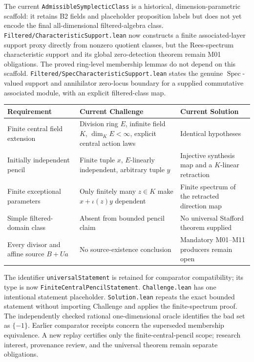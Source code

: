 \documentclass[10pt,a4paper]{article}
\newcommand{\lean}[1]{\nolinkurl{#1}}
\begin{document}
The current \lean{AdmissibleSymplecticClass} is a historical,
dimension-parametric scaffold: it retains B2 fields and placeholder
proposition labels but does not yet encode the final all-dimensional
filtered-algebra class. \lean{Filtered/CharacteristicSupport.lean} now
constructs a finite associated-layer support proxy directly from nonzero
quotient classes, but the Rees-spectrum characteristic support and its global
zero-detection theorem remain M01 obligations. The proved ring-level
membership lemmas do not depend on this scaffold.
\lean{Filtered/SpecCharacteristicSupport.lean} states the genuine
\(\operatorname{Spec}\)-valued support and annihilator zero-locus boundary for
a supplied commutative associated module, with an explicit filtered-class map.

\begin{center}
\begin{tabularx}{\textwidth}{@{}Y Y Y@{}}
\toprule
Requirement & Current Challenge & Current Solution\\
\midrule
Finite central field extension & Division ring \(E\), infinite field \(K\),
 \(\dim_K E<\infty\), explicit central action laws & Identical hypotheses\\
Initially independent pencil & Finite tuple \(x\), \(E\)-linearly independent,
 arbitrary tuple \(y\) & Injective synthesis map and a \(K\)-linear retraction\\
Finite exceptional parameters & Only finitely many \(z\in K\) make
 \(x+\iota(z)y\) dependent & Finite spectrum of the retracted direction map\\
Simple filtered-domain class & Absent from bounded pencil claim &
 No universal Stafford theorem supplied\\
Every divisor and affine source \(B+Ua\) & No source-existence conclusion &
 Mandatory M01--M11 producers remain open\\
\bottomrule
\end{tabularx}
\end{center}

The identifier \lean{universalStatement} is retained for comparator
compatibility; its type is now \lean{FiniteCentralPencilStatement}.
\lean{Challenge.lean} has one intentional statement placeholder.
\lean{Solution.lean} repeats the exact bounded statement without importing
Challenge and applies the finite-spectrum proof. The independently checked
rational one-dimensional oracle identifies the bad set as \(\{-1\}\).
Earlier comparator receipts concern the superseded membership equivalence.
A new replay certifies only the finite-central-pencil scope; research interest,
provenance review, and the universal theorem remain separate obligations.
\end{document}

